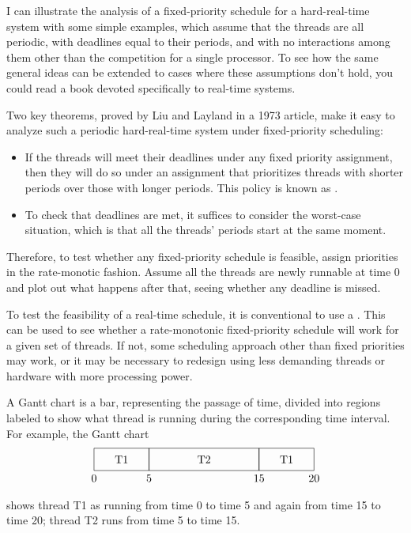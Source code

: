 I can illustrate the analysis of a fixed-priority schedule for a
hard-real-time system with some simple examples, which assume
that the threads are all periodic, with deadlines equal to their
periods, and with no interactions among them other than the
competition for a single processor.  To see how the same general ideas
can be extended to cases where these assumptions don't hold, you could
read a book devoted specifically to real-time systems.

Two key theorems, proved by Liu and
Layland in a 1973 article, make it easy
to analyze such a periodic hard-real-time system under fixed-priority
scheduling:
\begin{itemize}
\item
If the threads will meet their deadlines under any fixed priority
assignment, then they will do so under an assignment that prioritizes
threads with shorter periods over those with longer periods.
This policy is known as
.
\item
To check that deadlines are met, it suffices to consider the worst-case situation, which is that all the threads' periods start at the
same moment.
\end{itemize}
Therefore, to test whether any fixed-priority schedule is feasible,
assign priorities in the rate-monotic fashion.  Assume all the threads
are newly runnable at time 0 and plot out what happens after
that, seeing whether any deadline is missed.

To test the feasibility of a real-time schedule, it is conventional to
use a .  This can be
used to see whether a rate-monotonic fixed-priority schedule will work
for a given set of threads.  If not, some scheduling approach other
than fixed priorities may work, or it may be necessary to redesign
using less demanding threads or hardware with more processing power.

A Gantt chart is a bar, representing the passage of time, divided into
regions labeled to show what thread is running during the
corresponding time interval.  For example, the Gantt chart
\[\begin{tikzpicture}[scale=.035]
\draw (0,0) rectangle (50,20);
\draw (50,0) rectangle (150,20);
\draw (150,0) rectangle (200,20);
\draw (25,10) node{T1};
\draw (100,10) node{T2};
\draw (175,10) node{T1};
\draw (0,-7) node{0};
\draw (50,-7) node{5};
\draw (150,-7) node{15};
\draw (200,-7) node{20};
\end{tikzpicture}\]
\iffalse
\[\begin{graph}(210,32)(-3,-12)
\graphlinecolour{0}
\fillednodesfalse
\rectnode{a}[50,20](25,10)
\rectnode{b}[100,20](100,10)
\rectnode{c}[50,20](175,10)
\autonodetext{a}{T1}
\autonodetext{b}{T2}
\autonodetext{c}{T1}
\freetext(0,-7){0}
\freetext(50,-7){5}
\freetext(150,-7){15}
\freetext(200,-7){20}
\end{graph}\]
\fi
\iffalse
\begin{verbatim}
+----+---------+----+
| T1 |    T2   | T1 |
+----+---------+----+
0    5         15   20
\end{verbatim}
\fi
shows thread T1 as running from time 0 to time 5 and again from time
15 to time 20; thread T2 runs from time 5 to time 15.

